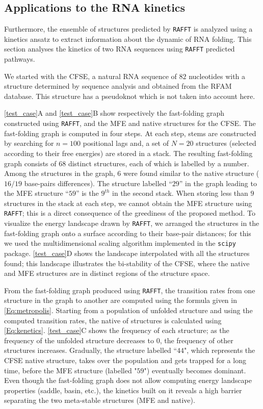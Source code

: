 \subsection{Applications to the RNA kinetics}

Furthermore, the ensemble of structures predicted by \texttt{RAFFT} is analyzed using a kinetics ansatz to extract information about the dynamic of RNA folding. This section analyses the kinetics of two \ac{RNA} sequences using \texttt{RAFFT} predicted pathways.

We started with the \ac{CFSE}, a natural \ac{RNA} sequence of $82$ nucleotides with a structure determined by sequence analysis and obtained from the RFAM database. This structure has a pseudoknot which is not taken into account here.

\autoref{test_case}A and \autoref{test_case}B show respectively the fast-folding graph constructed using \texttt{RAFFT}, and the \ac{MFE} and native structures for the \ac{CFSE}. The fast-folding graph is computed in four steps. At each step, stems are constructed by searching for $n=100$ positional lags and, a set of $N=20$ structures (selected according to their free energies) are stored in a stack. The resulting fast-folding graph consists of $68$ distinct structures, each of which is labelled by a number. Among the structures in the graph, $6$ were found similar to the native structure ($16/19$ base-pairs differences). The structure labelled ``$29$'' in the graph leading to the \ac{MFE} structure ``$59$'' is the $9^{th}$ in the second stack. When storing less than $9$ structures in the stack at each step, we cannot obtain the \ac{MFE} structure using \texttt{RAFFT}; this is a direct consequence of the greediness of the proposed method. To visualize the energy landscape drawn by \texttt{RAFFT}, we arranged the structures in the fast-folding graph onto a surface according to their base-pair distances; for this we used the multidimensional scaling algorithm implemented in the \texttt{scipy} package.  \autoref{test_case}D shows the landscape interpolated with all the structures found; this landscape illustrates the bi-stability of the \ac{CFSE}, where the native and \ac{MFE} structures are in distinct regions of the structure space.

From the fast-folding graph produced using \texttt{RAFFT}, the transition rates from one structure in the graph to another are computed using the formula given in \autoref{Eq:metropolis}. Starting from a population of unfolded structure and using the computed transition rates, the native of structures is calculated using \autoref{Eq:kenetics}. \autoref{test_case}C shows the frequency of each structure; as the frequency of the unfolded structure decreases to $0$, the frequency of other structures increases. Gradually, the structure labelled ``$44$", which represents the \ac{CFSE} native structure, takes over the population and gets trapped for a long time, before the \ac{MFE} structure (labelled "$59$") eventually becomes dominant. Even though the fast-folding graph does not allow computing energy landscape properties (saddle, basin, etc.), the kinetics built on it reveals a high barrier separating the two meta-stable structures (\ac{MFE} and native). 

